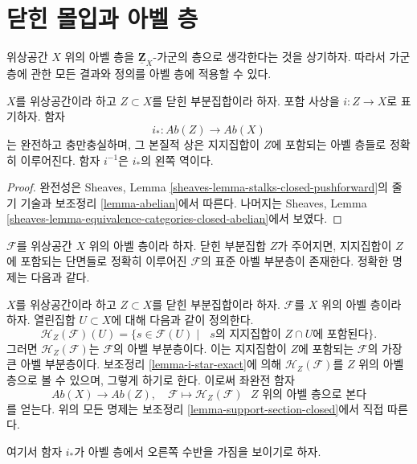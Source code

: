 \section{닫힌 몰입과 아벨 층}
\label{section-closed-immersions}

\noindent
위상공간 $X$ 위의 아벨 층을 $\underline{\mathbf{Z}}_X$-가군의 층으로
생각한다는 것을 상기하자. 따라서 가군층에 관한 모든 결과와 정의를
아벨 층에 적용할 수 있다.

\begin{lemma}
\label{lemma-i-star-exact}
$X$를 위상공간이라 하고 $Z \subset X$를 닫힌 부분집합이라 하자.
포함 사상을 $i : Z \to X$로 표기하자. 함자
$$
i_* : \textit{Ab}(Z) \longrightarrow \textit{Ab}(X)
$$
는 완전하고 충만충실하며, 그 본질적 상은 지지집합이 $Z$에 포함되는
아벨 층들로 정확히 이루어진다. 함자 $i^{-1}$은 $i_*$의 왼쪽 역이다.
\end{lemma}

\begin{proof}
완전성은 Sheaves, Lemma \ref{sheaves-lemma-stalks-closed-pushforward}의
줄기 기술과 보조정리 \ref{lemma-abelian}에서 따른다. 나머지는 Sheaves,
Lemma \ref{sheaves-lemma-equivalence-categories-closed-abelian}에서 보였다.
\end{proof}

\noindent
$\mathcal{F}$를 위상공간 $X$ 위의 아벨 층이라 하자. 닫힌 부분집합 $Z$가
주어지면, 지지집합이 $Z$에 포함되는 단면들로 정확히 이루어진
$\mathcal{F}$의 표준 아벨 부분층이 존재한다. 정확한 명제는 다음과 같다.

\begin{remark}
\label{remark-sections-support-in-closed}
$X$를 위상공간이라 하고 $Z \subset X$를 닫힌 부분집합이라 하자.
$\mathcal{F}$를 $X$ 위의 아벨 층이라 하자. 열린집합 $U \subset X$에 대해
다음과 같이 정의한다.
$$
\mathcal{H}_Z(\mathcal{F})(U) =
\{s \in \mathcal{F}(U) \mid
\text{ }s\text{의 지지집합이 }Z \cap U\text{에 포함된다}\}.
$$
그러면 $\mathcal{H}_Z(\mathcal{F})$는 $\mathcal{F}$의 아벨 부분층이다.
이는 지지집합이 $Z$에 포함되는 $\mathcal{F}$의 가장 큰 아벨 부분층이다.
보조정리 \ref{lemma-i-star-exact}에 의해 $\mathcal{H}_Z(\mathcal{F})$를
$Z$ 위의 아벨 층으로 볼 수 있으며, 그렇게 하기로 한다. 이로써 좌완전 함자
$$
\textit{Ab}(X) \longrightarrow \textit{Ab}(Z),\quad
\mathcal{F} \longmapsto \mathcal{H}_Z(\mathcal{F})
\text{ }Z\text{ 위의 아벨 층으로 본다}
$$
를 얻는다. 위의 모든 명제는 보조정리 \ref{lemma-support-section-closed}에서
직접 따른다.
\end{remark}

\noindent
여기서 함자 $i_*$가 아벨 층에서 오른쪽 수반을 가짐을 보이기로 하자.

